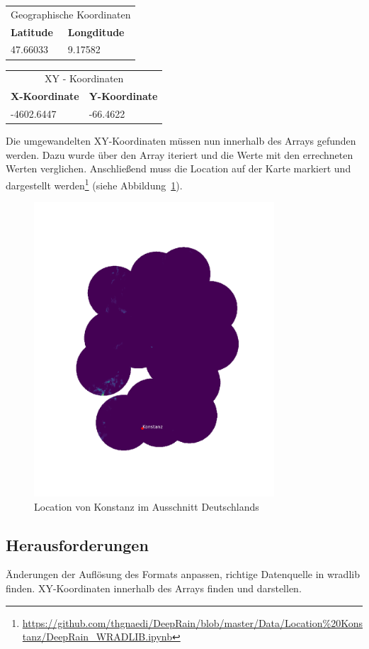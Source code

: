\begin{table}[H]
\centering
\begin{tabularx}{8cm}{X|X}
\multicolumn{2}{c}{Geographische Koordinaten}\\
\textbf{Latitude} & \textbf{Longditude}\\\hline
47.66033          & 9.17582\\
\end{tabularx} 	
\end{table}

\begin{table}[H]
\centering
\begin{tabularx}{8cm}{X|X}
\multicolumn{2}{c}{XY - Koordinaten}\\
\textbf{X-Koordinate} & \textbf{Y-Koordinate}\\\hline
-4602.6447            & -66.4622\\
\end{tabularx} 	
\end{table}

Die umgewandelten XY-Koordinaten müssen nun innerhalb des Arrays gefunden werden. Dazu wurde über den Array iteriert und die Werte mit den errechneten Werten verglichen. Anschließend muss die Location auf der Karte markiert und dargestellt werden\footnote{\url{https://github.com/thgnaedi/DeepRain/blob/master/Data/Location\%20Konstanz/DeepRain_WRADLIB.ipynb}} (siehe Abbildung~\ref{fig:location}).

\begin{figure}[H]
	\centering
	\includegraphics[width=0.8\textwidth]{pics/Location}
	\caption{Location von Konstanz im Ausschnitt Deutschlands}
	\label{fig:location}
\end{figure}

\subsection{Herausforderungen} 
Änderungen der Auflösung des Formats anpassen, richtige Datenquelle in wradlib finden. XY-Koordinaten innerhalb des Arrays finden und darstellen.
